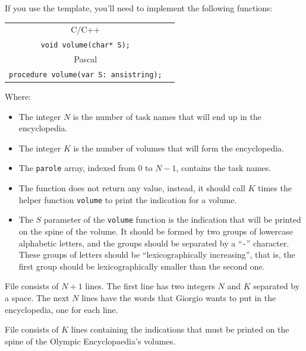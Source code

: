 If you use the template, you'll need to implement the following functions:
\begin{center}\begin{tabularx}{\textwidth}{|c|X|}
\hline
C/C++  & \begin{tabular}[x]{@{}@{}}\verb|void rilega(int N, int K, char* parole[]);|\\ \verb|void volume(char* S);|\end{tabular}\\
\hline
Pascal & \begin{tabular}[x]{@{}@{}}\verb|procedure rilega(N, K: longint; var parole: array of ansistring);|\\ \verb|procedure volume(var S: ansistring);|\end{tabular}\\
\hline
\end{tabularx}\end{center}
Where:
\begin{itemize}[nolistsep]
  \item The integer $N$ is the number of task names that will end up in the encyclopedia.
  \item The integer $K$ is the number of volumes that will form the encyclopedia.
  \item The \texttt{parole} array, indexed from $0$ to $N-1$, contains the task names.
  \item The function does not return any value, instead, it should call $K$ times the helper function \texttt{volume} to print the indication for a volume.
  \item The $S$ parameter of the \texttt{volume} function is the indication that will be printed on the spine of the volume. It should be formed by two groups of lowercase alphabetic letters, and the groups should be separated by a ``\texttt{-}'' character. These groups of letters should be ``lexicographically increasing'', that is, the first group should be lexicographically smaller than the second one.
\end{itemize}

\InputFile
File  consists of $N+1$ lines. The first line has two integers $N$ and $K$ separated by a space. The next $N$ lines have the words that Giorgio wants to put in the encyclopedia, one for each line.

\OutputFile
File \outputfile{} consists of $K$ lines containing the indications that must be printed on the spine of the Olympic Encyclopaedia's volumes.

